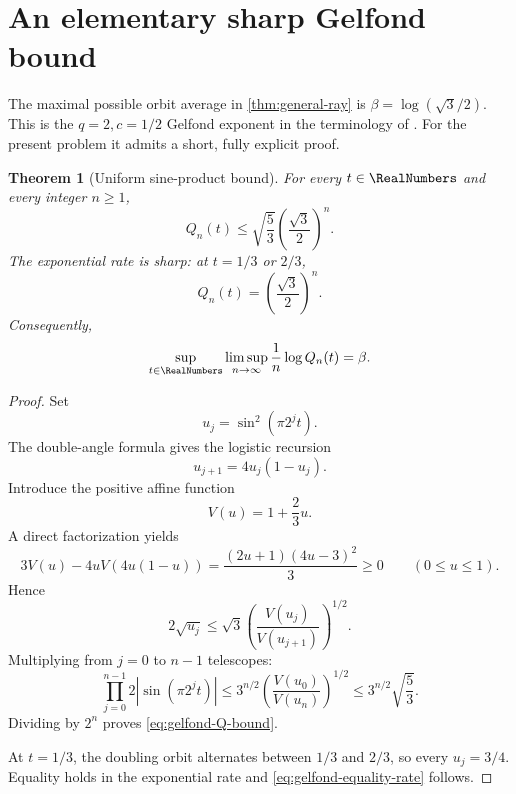 \documentclass[11pt,oneside]{article}
\newtheorem{theorem}{Theorem}[section]
\theoremstyle{definition}
\theoremstyle{remark}
\begin{document}
\section{An elementary sharp Gelfond bound}
\label{sec:gelfond}

The maximal possible orbit average in \cref{thm:general-ray} is
\(\beta=\log(\sqrt3/2)\).  This is the \(q=2,c=1/2\) Gelfond exponent in the
terminology of \cite{fan2021}.  For the present problem it admits a short,
fully explicit proof.

\begin{theorem}[Uniform sine-product bound]
\label{thm:gelfond-bound}
For every \(t\in\RealNumbers\) and every integer \(n\ge1\),
\begin{equation}
 Q_n(t)
 \le\sqrt{\frac53}\left(\frac{\sqrt3}{2}\right)^n.
 \label{eq:gelfond-Q-bound}
\end{equation}
The exponential rate is sharp: at \(t=1/3\) or \(2/3\),
\begin{equation}
 Q_n(t)=\left(\frac{\sqrt3}{2}\right)^n.
 \label{eq:gelfond-equality-rate}
\end{equation}
Consequently,
\begin{equation}
 \sup_{t\in\RealNumbers}\limsup_{n\to\infty}\frac1n\log Q_n(t)
 =\beta.
 \label{eq:max-alpha-beta}
\end{equation}
\end{theorem}

\begin{proof}
Set
\[
 u_j=\sin^2(\pi2^j t).
\]
The double-angle formula gives the logistic recursion
\begin{equation}
 u_{j+1}=4u_j(1-u_j).
 \label{eq:logistic-recursion}
\end{equation}
Introduce the positive affine function
\[
 V(u)=1+\frac23u.
\]
A direct factorization yields
\begin{equation}
 3V(u)-4uV(4u(1-u))
 =\frac{(2u+1)(4u-3)^2}{3}\ge0
 \qquad(0\le u\le1).
 \label{eq:subaction-identity}
\end{equation}
Hence
\[
 2\sqrt{u_j}
 \le\sqrt3\left(\frac{V(u_j)}{V(u_{j+1})}\right)^{1/2}.
\]
Multiplying from \(j=0\) to \(n-1\) telescopes:
\[
 \prod_{j=0}^{n-1}2|\sin(\pi2^j t)|
 \le3^{n/2}\left(\frac{V(u_0)}{V(u_n)}\right)^{1/2}
 \le3^{n/2}\sqrt{\frac53}.
\]
Dividing by \(2^n\) proves \eqref{eq:gelfond-Q-bound}.

At \(t=1/3\), the doubling orbit alternates between \(1/3\) and \(2/3\), so
every \(u_j=3/4\).  Equality holds in the exponential rate and
\eqref{eq:gelfond-equality-rate} follows.
\end{proof}
\end{document}
